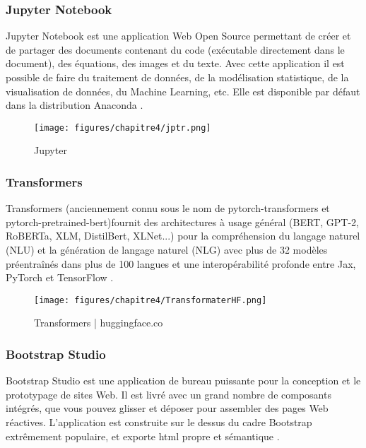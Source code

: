         \subsubsection{Jupyter Notebook}
        \par Jupyter Notebook est une application Web Open Source permettant de créer et de partager des documents contenant du code (exécutable directement dans le document), des équations, des images et du texte. Avec cette application il est possible de faire du traitement de données, de la modélisation statistique, de la visualisation de données, du Machine Learning, etc. Elle est disponible par défaut dans la distribution Anaconda \cite{ggcolabjptr}.
        
        \begin{figure}[H]
        	\begin{center}
        		\texttt{[image: figures/chapitre4/jptr.png]}
        	\end{center}
        	\caption {Jupyter}
        	\label{fig:jptr}
        \end{figure}  
        
        \subsubsection{Transformers}
        \par Transformers (anciennement connu sous le nom de pytorch-transformers et pytorch-pretrained-bert)fournit des architectures à usage général (BERT, GPT-2, RoBERTa, XLM, DistilBert, XLNet...) pour la compréhension du langage naturel (NLU) et la génération de langage naturel (NLG) avec plus de 32 modèles préentraînés dans plus de 100 langues et une interopérabilité profonde entre Jax, PyTorch et TensorFlow \cite{transformer}.
        
        \begin{figure}[H]
        	\begin{center}
        		\texttt{[image: figures/chapitre4/TransformaterHF.png]}
        	\end{center}
        	\caption {Transformers | huggingface.co}
        	\label{fig:transformerhf}
        \end{figure}
        
        
        \subsubsection{Bootstrap Studio }
        \par Bootstrap Studio est une application de bureau puissante pour la conception et le prototypage de sites Web. Il est livré avec un grand nombre de composants intégrés, que vous pouvez glisser et déposer pour assembler des pages Web réactives. L’application est construite sur le dessus du cadre Bootstrap extrêmement populaire, et exporte html propre et sémantique \cite{bootstrpstudio}.
        
